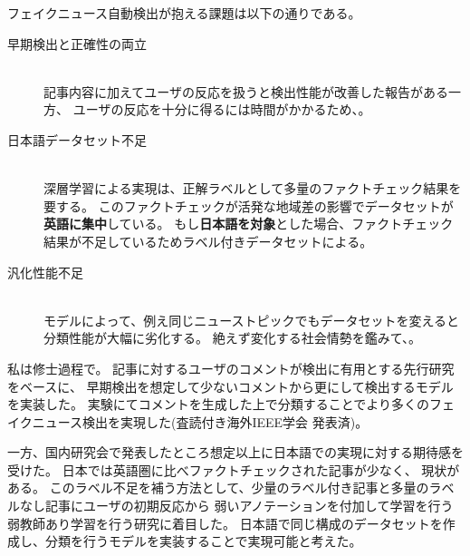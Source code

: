 フェイクニュース自動検出が抱える課題は以下の通りである。
\begin{description}
    \item[早期検出と正確性の両立] \mbox{}\\
        記事内容に加えてユーザの反応を扱うと検出性能が改善した報告がある\cite{Wu:2018:TFF:3159652.3159677}一方、
        ユーザの反応を十分に得るには時間がかかるため、。
    \item[日本語データセット不足] \mbox{}\\
        深層学習による実現は、正解ラベルとして多量のファクトチェック結果を要する。
        このファクトチェックが活発な地域差の影響でデータセットが\textbf{英語に集中}\cite{fakenewsnet}している。
        もし\textbf{日本語を対象}とした場合、ファクトチェック結果が不足しているためラベル付きデータセットによる。
    \item[汎化性能不足] \mbox{}\\
        モデルによって、例え同じニューストピックでもデータセットを変えると分類性能が大幅に劣化する\cite{coviddiff}。
        絶えず変化する社会情勢を鑑みて、。
\end{description}

私は修士過程で。
記事に対するユーザのコメントが検出に有用とする先行研究をベースに、
早期検出を想定して少ないコメントから更にして検出するモデルを実装した。
実験にてコメントを生成した上で分類することでより多くのフェイクニュース検出を実現した(査読付き海外IEEE学会 発表済\cite{ines})。

一方、国内研究会で発表したところ想定以上に日本語での実現に対する期待感を受けた。
日本では英語圏に比べファクトチェックされた記事が少なく、
現状がある。
このラベル不足を補う方法として、少量のラベル付き記事と多量のラベルなし記事にユーザの初期反応から
弱いアノテーションを付加して学習を行う弱教師あり学習を行う研究\cite{mwss}に着目した。
日本語で同じ構成のデータセットを作成し、分類を行うモデルを実装することで実現可能と考えた。


